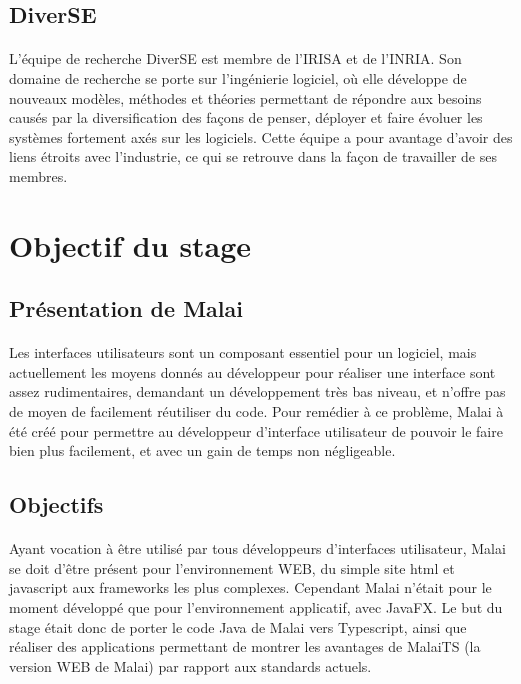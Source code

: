 \documentclass[11pt, a4paper, pdftex]{article}
\begin{document}
    \subsection{DiverSE}\label{subsec:diverse}
             \paragraph{}
                L'équipe de recherche DiverSE est membre de l'IRISA et de l'INRIA. Son domaine de recherche se porte sur l'ingénierie logiciel, où elle développe de nouveaux modèles,
                méthodes et théories permettant de répondre aux besoins causés par la diversification des façons de penser, déployer et faire évoluer les systèmes fortement axés sur les logiciels.
                Cette équipe a pour avantage d'avoir des liens étroits avec l'industrie, ce qui se retrouve dans la façon de travailler de ses membres.
    \newpage
    \section{Objectif du stage}\label{sec:objsta}
    \vspace{1cm}
        \subsection{Présentation de Malai}\label{subsec:premal}
            \paragraph{}
                Les interfaces utilisateurs sont un composant essentiel pour un logiciel, mais actuellement les moyens donnés au développeur pour réaliser
                une interface sont assez rudimentaires, demandant un développement très bas niveau, et n'offre pas de moyen de facilement réutiliser du code.
                Pour remédier à ce problème, Malai à été créé pour permettre au développeur d'interface utilisateur de pouvoir le faire bien plus facilement, et avec un gain de temps non négligeable.
    \vspace{1cm}
        \subsection{Objectifs}\label{subsec:objsta}
            \paragraph{}
                Ayant vocation à être utilisé par tous développeurs d'interfaces utilisateur, Malai se doit d'être présent pour l'environnement WEB, du simple site html et javascript aux frameworks les plus complexes.
                Cependant Malai n'était pour le moment développé que pour l'environnement applicatif, avec JavaFX. Le but du stage était donc de porter le code Java de Malai
                vers Typescript, ainsi que réaliser des applications permettant de montrer les avantages de MalaiTS (la version WEB de Malai) par rapport aux standards actuels.
\end{document}
